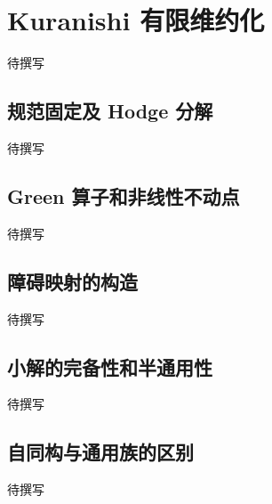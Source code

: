 
% 
% 

\section{Kuranishi 有限维约化}
\label{g4:sec:2903}

待撰写

\subsection{规范固定及 Hodge 分解}
\label{g4:subsec:2903:01}
待撰写

\subsection{Green 算子和非线性不动点}
\label{g4:subsec:2903:02}
待撰写

\subsection{障碍映射的构造}
\label{g4:subsec:2903:03}
待撰写

\subsection{小解的完备性和半通用性}
\label{g4:subsec:2903:04}
待撰写

\subsection{自同构与通用族的区别}
\label{g4:subsec:2903:05}
待撰写
